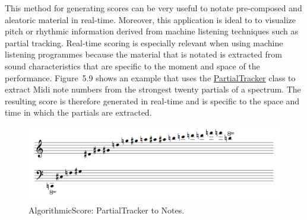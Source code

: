 This method for generating scores can be very useful to notate pre-composed and aleatoric material in real-time. Moreover, this application is ideal to to visualize pitch or rhythmic information derived from machine listening techniques such as partial tracking. Real-time scoring is especially relevant when using machine listening programmes because the material that is notated is extracted from sound characteristics that are specific to the moment and space of the performance. \mbox{Figure 5.9} shows an example that uses the \hyperlink{partrack}{PartialTracker} class to extract Midi note numbers from the strongest twenty partials of a spectrum. The resulting score is therefore generated in real-time and is specific to the space and time in which the partials are extracted.
\begin{figure}[htbp] %
   \centering
   \includegraphics[width=17cm]{chapter5/algoScore_partials.tif} %
   \caption{AlgorithmicScore: PartialTracker to Notes.}
   \label{fig:example}
\end{figure}\

